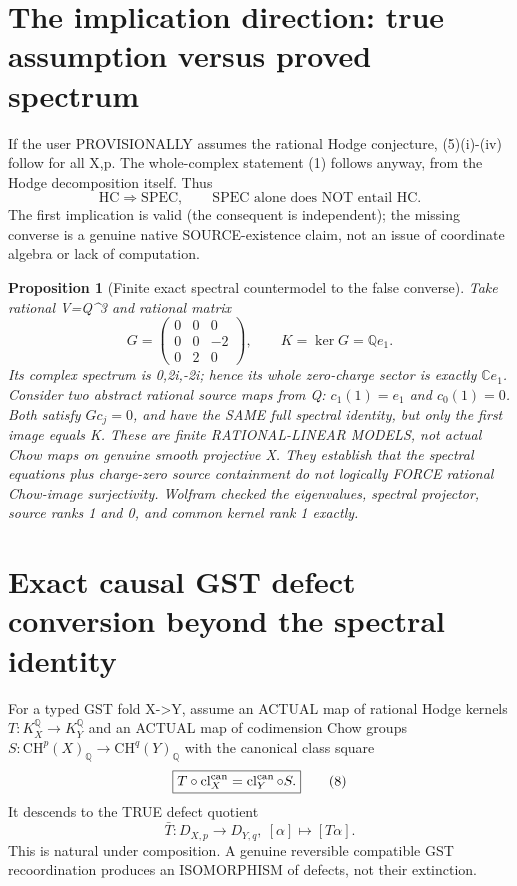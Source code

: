 \documentclass[11pt]{article}
\newtheorem{proposition}[theorem]{Proposition}
\newcommand{\QQ}{\mathbb Q}
\newcommand{\CC}{\mathbb C}
\newcommand{\CH}{\mathrm{CH}}
\newcommand{\cl}{\operatorname{cl}}
\begin{document}
\section{The implication direction: true assumption versus proved spectrum}
If the user PROVISIONALLY assumes the rational Hodge
conjecture, (5)(i)-(iv) follow for all X,p.
The whole-complex statement (1) follows anyway,
from the Hodge decomposition itself. Thus
\[
 \boxed{\mathrm{HC}\Rightarrow\mathrm{SPEC},\qquad
 \mathrm{SPEC}\text{ alone does NOT entail }\mathrm{HC}.} \tag{7}
\]
The first implication is valid (the consequent is independent);
the missing converse is a genuine native SOURCE-existence claim,
not an issue of coordinate algebra or lack of computation.

\begin{proposition}[Finite exact spectral countermodel to the false converse]
Take rational V=Q^3 and rational matrix
\[
 G=\begin{pmatrix}
 0&0&0\\0&0&-2\\0&2&0
 \end{pmatrix},\qquad
 K=\ker G=\QQ e_1.
\]
Its complex spectrum is 0,2i,-2i; hence its whole
zero-charge sector is exactly \(\CC e_1\).
Consider two abstract rational source maps from Q:
\(c_1(1)=e_1\) and \(c_0(1)=0\).
Both satisfy \(Gc_j=0\), and have the SAME full
spectral identity, but only the first image equals K.
These are finite RATIONAL-LINEAR MODELS, not actual
Chow maps on genuine smooth projective X.
They establish that the spectral equations plus
charge-zero source containment do not logically FORCE
rational Chow-image surjectivity.
Wolfram checked the eigenvalues, spectral projector,
source ranks 1 and 0, and common kernel rank 1 exactly.
\end{proposition}

\section{Exact causal GST defect conversion beyond the spectral identity}
For a typed GST fold X->Y, assume an ACTUAL
map of rational Hodge kernels \(T:K^\QQ_X\to K^\QQ_Y\)
and an ACTUAL map of codimension Chow groups
\(S:\CH^p(X)_\QQ\to\CH^q(Y)_\QQ\)
with the canonical class square
\[
 \boxed{T\circ\cl_X^{\rm can}
                  =\cl_Y^{\rm can}\circ S.}       \tag{8}
\]
It descends to the TRUE defect quotient
\[
 \boxed{\bar T:D_{X,p}\to D_{Y,q},\
                   [\alpha]\mapsto[T\alpha].}    \tag{9}
\]
This is natural under composition. A genuine
reversible compatible GST recoordination produces
an ISOMORPHISM of defects, not their extinction.
\end{document}
